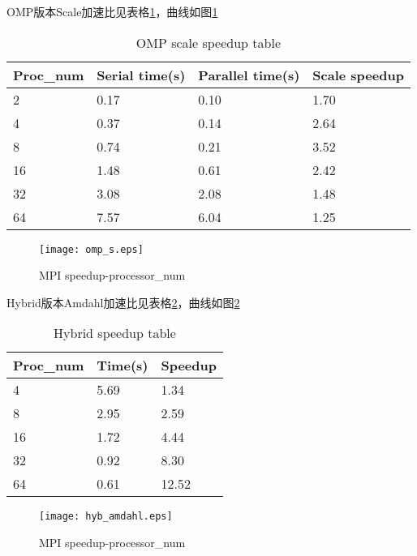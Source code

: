 \documentclass{ctexart}
\begin{document}
OMP版本Scale加速比见表格\ref{tab:omp_s}，曲线如图\ref{fig:omp_s}
\begin{table}[]
    \centering
    \caption{OMP scale speedup table} 
    \label{tab:omp_s} 
    \begin{tabular}{@{}llll@{}}
        \toprule
        Proc\_num & Serial time(s) & Parallel time(s) & Scale speedup \\ \midrule
        2         & 0.17           & 0.10             & 1.70          \\
        4         & 0.37           & 0.14             & 2.64          \\
        8         & 0.74           & 0.21             & 3.52          \\
        16        & 1.48           & 0.61             & 2.42          \\
        32        & 3.08           & 2.08             & 1.48          \\
        64        & 7.57           & 6.04             & 1.25         \\ \bottomrule
    \end{tabular}
\end{table}
\begin{figure}
    \centering 
    \texttt{[image: omp\_s.eps]} 
    \caption{MPI speedup-processor\_num} 
    \label{fig:omp_s} 
\end{figure}


Hybrid版本Amdahl加速比见表格\ref{tab:hyb_a}，曲线如图\ref{fig:hyb_a}
\begin{table}[]
    \centering
    \caption{Hybrid speedup table} 
    \label{tab:hyb_a} 
    \begin{tabular}{@{}lll@{}}
        \toprule
        Proc\_num & Time(s) & Speedup \\ \midrule
        4         & 5.69    & 1.34    \\
        8         & 2.95    & 2.59    \\
        16        & 1.72    & 4.44    \\
        32        & 0.92    & 8.30    \\
        64        & 0.61    & 12.52   \\ \bottomrule
    \end{tabular}
\end{table}
\begin{figure}
    \centering 
    \texttt{[image: hyb\_amdahl.eps]} 
    \caption{MPI speedup-processor\_num} 
    \label{fig:hyb_a} 
\end{figure}
\end{document}
